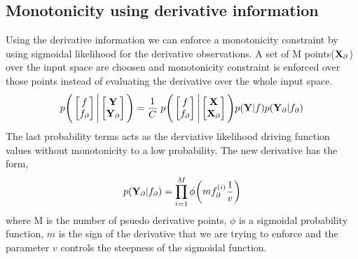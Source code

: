 \subsection{Monotonicity using derivative information}
Using the derivative information we can enforce a monotonicity constraint by using sigmoidal likelihood for the derivative observations. A set of M points($\mathbf{X}_{\partial}$) over the input space are choosen and monotonicity constraint is enforced over those points instead of evaluating the derivative over the whole input space. 
\begin{align*}
p\Bigg(\begin{bmatrix} f \\ f_{\partial} \end{bmatrix} \Bigg| \begin{bmatrix} \mathbf{Y} \\ \mathbf{Y}_{\partial}\end{bmatrix} \Bigg) = 
\frac{1}{C}\ p\Bigg(\begin{bmatrix} f \\ f_{\partial}\end{bmatrix} \Bigg| \begin{bmatrix} \mathbf{X} \\ \mathbf{X}_{\partial}\end{bmatrix} \Bigg) p(\mathbf{Y}|f)p(\mathbf{Y}_{\partial}|f_{\partial})
\end{align*}
The last probability terms acts as the derviative likelihood driving function values without monotonicity to a low probability. The new derivative has the form,
\begin{align*}
p(\mathbf{Y}_{\partial}|f_{\partial}) = \prod_{i=1}^{M}\phi\bigg(m f_{\partial}^{(i)} \frac{1}{v}\bigg)
\end{align*}
where M is the number of psuedo derivative points, $\phi$ is a sigmoidal probability function, $m$ is the sign of the derivative that we are trying to enforce and the parameter $v$ controls the steepness of the sigmoidal function.

